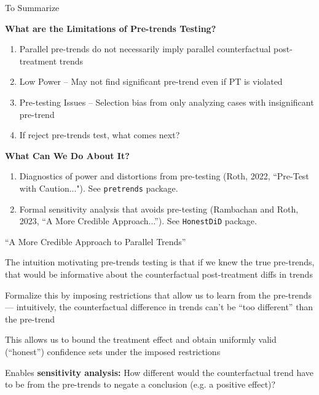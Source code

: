 \documentclass[aspectratio = 169, 13pt]{beamer}
\begin{document}
\begin{frame}{To Summarize}
	
	\textbf{What are the Limitations of Pre-trends Testing?}
	\begin{enumerate}
		\item
		Parallel pre-trends do not necessarily imply parallel counterfactual post-treatment trends
		
		\item
		Low Power -- May not find significant pre-trend even if PT is violated
		
		\item
		Pre-testing Issues -- Selection bias from only analyzing cases with insignificant pre-trend
		
		\item
		If reject pre-trends test, what comes next? 
	\end{enumerate}
	
	\bigskip
	\pause 
	
	\textbf{What Can We Do About It?}
	\begin{enumerate}
		\item 
		Diagnostics of power and distortions from pre-testing (Roth, 2022, ``Pre-Test with Caution..."). See \texttt{pretrends} package. \hyperlink{power_analysis}{}
		
		\item
		Formal sensitivity analysis that avoids pre-testing (Rambachan and Roth, 2023, ``A More Credible Approach...''). See \texttt{HonestDiD} package.
		
	\end{enumerate}
	
\end{frame}




\begin{frame}{``A More Credible Approach to Parallel Trends''}
	\begin{wideitemize}
		
		
		\item The intuition motivating pre-trends testing is that if we knew the true pre-trends, that would be informative about the counterfactual post-treatment diffs in trends
		
		\item 
		Formalize this by imposing restrictions that allow us to learn from the pre-trends --- intuitively, the counterfactual difference in trends can't be ``too different'' than the pre-trend
		
		
		\item This allows us to bound the treatment effect and obtain uniformly valid (``honest'') confidence sets under the imposed restrictions
		
		
		\item Enables \textbf{sensitivity analysis:} How different would the counterfactual trend have to be from the pre-trends to negate a conclusion (e.g. a positive effect)?
		
	\end{wideitemize}
	
\end{frame}
\end{document}
